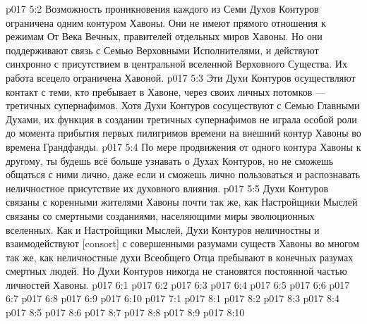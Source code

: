 \vs p017 5:2 Возможность проникновения каждого из Семи Духов Контуров ограничена одним контуром Хавоны. Они не имеют прямого отношения к режимам От Века Вечных, правителей отдельных миров Хавоны. Но они поддерживают связь с Семью Верховными Исполнителями, и действуют синхронно с присутствием в центральной вселенной Верховного Существа. Их работа всецело ограничена Хавоной.
\vs p017 5:3 Эти Духи Контуров осуществляют контакт с теми, кто пребывает в Хавоне, через своих личных потомков --- третичных супернафимов. Хотя Духи Контуров сосуществуют с Семью Главными Духами, их функция в создании третичных супернафимов не играла особой роли до момента прибытия первых пилигримов времени на внешний контур Хавоны во времена Грандфанды.
\vs p017 5:4 По мере продвижения от одного контура Хавоны к другому, ты будешь всё больше узнавать о Духах Контуров, но не сможешь общаться с ними лично, даже если и сможешь лично пользоваться и распознавать неличностное присутствие их духовного влияния.
\vs p017 5:5 Духи Контуров связаны с коренными жителями Хавоны почти так же, как Настройщики Мыслей связаны со смертными созданиями, населяющими миры эволюционных вселенных. Как и Настройщики Мыслей, Духи Контуров неличностны и взаимодействуют [consort] с совершенными разумами существ Хавоны во многом так же, как неличностные духи Всеобщего Отца пребывают в конечных разумах смертных людей. Но Духи Контуров никогда не становятся постоянной частью личностей Хавоны.
\vs p017 6:1 
\vs p017 6:2 \pc 
\vs p017 6:3 
\vs p017 6:4 
\vs p017 6:5 
\vs p017 6:6 
\vs p017 6:7 
\vs p017 6:8 
\vs p017 6:9 
\vs p017 6:10 
\vs p017 7:1 
\vs p017 8:1 
\vs p017 8:2 \pc 
\vs p017 8:3 \pc 
\vs p017 8:4 
\vs p017 8:5 
\vs p017 8:6 
\vs p017 8:7 
\vs p017 8:8 
\vs p017 8:9 \pc 
\vsetoff
\vs p017 8:10 
\quizlink
